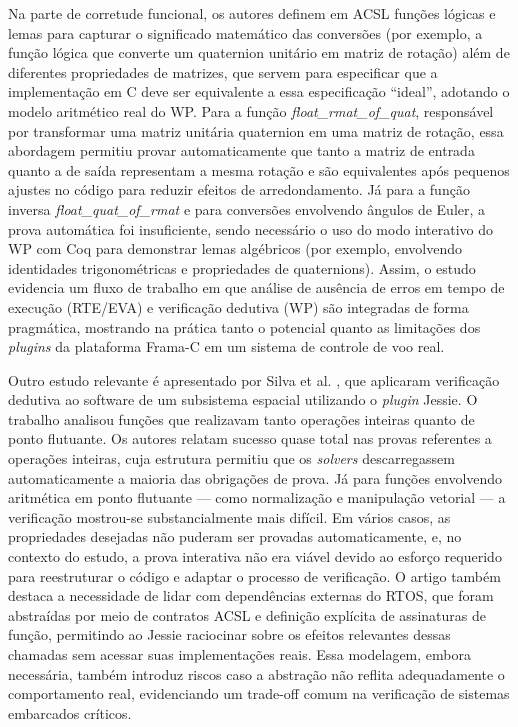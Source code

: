 \documentclass{article}
\begin{document}
Na parte de corretude funcional, os autores definem em ACSL funções lógicas e lemas para capturar o
significado matemático das conversões (por exemplo, a função lógica que converte um quaternion unitário em matriz de rotação) além de diferentes propriedades de matrizes, que servem para especificar que a implementação em C deve ser equivalente a essa
especificação “ideal”, adotando o modelo aritmético real do WP. Para a função \emph{float\_rmat\_of\_quat}, responsável por transformar uma matriz unitária quaternion em uma matriz de rotação, essa abordagem permitiu provar automaticamente que 
tanto a matriz de entrada quanto a de saída representam a mesma rotação e são equivalentes após pequenos ajustes no código para reduzir efeitos de arredondamento. Já para a função inversa \emph{float\_quat\_of\_rmat}
e para conversões envolvendo ângulos de Euler, a prova automática foi insuficiente, sendo necessário o uso do modo interativo do WP com Coq para demonstrar lemas algébricos (por exemplo, envolvendo
identidades trigonométricas e propriedades de quaternions). Assim, o estudo evidencia um fluxo de trabalho em que análise de ausência de erros em tempo de execução (RTE/EVA) e verificação dedutiva
(WP) são integradas de forma pragmática, mostrando na prática tanto o potencial quanto as limitações dos \emph{plugins} da plataforma Frama-C em um sistema de controle de voo real.


Outro estudo relevante é apresentado por Silva et al. \cite{silva2016formal}, que aplicaram verificação dedutiva ao software de um subsistema espacial utilizando o \emph{plugin} Jessie. O trabalho
analisou funções que realizavam tanto operações inteiras quanto de ponto flutuante. Os autores relatam sucesso quase total nas provas referentes a operações inteiras, cuja estrutura permitiu que os
\emph{solvers} descarregassem automaticamente a maioria das obrigações de prova. Já para funções envolvendo aritmética em ponto flutuante — como normalização e manipulação vetorial — a verificação
mostrou-se substancialmente mais difícil. Em vários casos, as propriedades desejadas não puderam ser provadas automaticamente, e, no contexto do estudo, a prova interativa não era viável devido ao
esforço requerido para reestruturar o código e adaptar o processo de verificação. O artigo também destaca a necessidade de lidar com dependências externas do RTOS, que foram abstraídas por meio de
contratos ACSL e definição explícita de assinaturas de função, permitindo ao Jessie raciocinar sobre os efeitos relevantes dessas chamadas sem acessar suas implementações reais. Essa modelagem, embora
necessária, também introduz riscos caso a abstração não reflita adequadamente o comportamento real, evidenciando um trade-off comum na verificação de sistemas embarcados críticos.
\end{document}
